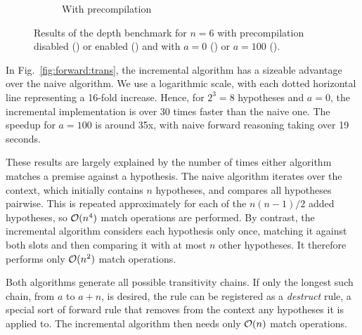 \begin{figure}
\begin{subfigure}{.5\textwidth}
    \caption{With precompilation}%
    \label{fig:forward:erase-precomp}
  \end{subfigure}
  \caption{Results of the depth benchmark for $n = 6$ with precompilation disabled () or enabled () and with $a = 0$ (\protect\showpgfsquare) or $a = 100$ (\protect\showpgfcircle).}%
\end{figure}

In Fig.~\ref{fig:forward:trans}, the incremental algorithm has a sizeable advantage over the naive algorithm.
We use a logarithmic scale, with each dotted horizontal line representing a 16-fold increase.
Hence, for $2^{3} = 8$ hypotheses and $a = 0$, the incremental implementation is over 30 times faster than the naive one.
The speedup for $a = 100$ is around 35x, with naive forward reasoning taking over 19 seconds.

These results are largely explained by the number of times either algorithm matches a premise against a hypothesis.
The naive algorithm iterates over the context, which initially contains $n$ hypotheses, and compares all hypotheses pairwise.
This is repeated approximately for each of the $n(n-1)/2$ added hypotheses, so $\mathcal{O}(n^4)$ match operations are performed.
By contrast, the incremental algorithm considers each hypothesis only once, matching it against both slots and then comparing it with at most $n$ other hypotheses.
It therefore performs only $\mathcal{O}(n^2)$ match operations.

Both algorithms generate all possible transitivity chains.
If only the longest such chain, from $a$ to $a + n$, is desired, the rule can be registered as a \emph{destruct} rule, a special sort of forward rule that removes from the context any hypotheses it is applied to.
The incremental algorithm then needs only $\mathcal{O}(n)$ match operations.

